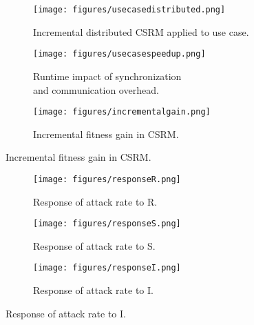 \begin{figure}
    \begin{subfigure}{0.7\textwidth}
        \texttt{[image: figures/usecasedistributed.png]}
		\caption{Incremental distributed CSRM applied to use case.}
		\label{fig:usecasedistributed}
    \end{subfigure}
    \begin{subfigure}{0.7\textwidth}
        \texttt{[image: figures/usecasespeedup.png]}
		\caption{Runtime impact of synchronization\\ and communication overhead.}
		\label{fig:usecasespeedup}
    \end{subfigure}
        \begin{subfigure}{0.7\textwidth}
        \texttt{[image: figures/incrementalgain.png]}
        \caption{Incremental fitness gain in CSRM.}
        \label{fig:incrementalgain}
    \end{subfigure}
\end{figure}
\begin{figure}
    \begin{subfigure}{0.7\textwidth}
        \texttt{[image: figures/responseR.png]}
        \caption{Response of attack rate to R.}
    \end{subfigure}
    \begin{subfigure}{0.7\textwidth}
        \texttt{[image: figures/responseS.png]}
        \caption{Response of attack rate to S.}
    \end{subfigure}
        \begin{subfigure}{0.7\textwidth}
        \texttt{[image: figures/responseI.png]}
        \caption{Response of attack rate to I.}
        \label{fig:usecaseresponseplots}
    \end{subfigure}
\end{figure}

